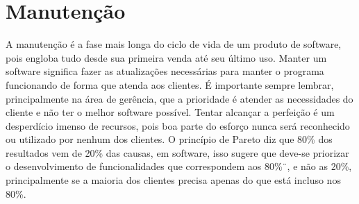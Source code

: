\documentclass{article}
\begin{document}
\section{Manutenção}
A manutenção é a fase mais longa do ciclo de vida de um produto de software, pois engloba tudo desde sua primeira venda até seu último uso. Manter um software significa fazer as atualizações necessárias para manter o programa funcionando de forma que atenda aos clientes. É importante sempre lembrar, principalmente na área de gerência, que a prioridade é atender as necessidades do cliente e não ter o melhor software possível. Tentar alcançar a perfeição é um desperdício imenso de recursos, pois boa parte do esforço nunca será reconhecido ou utilizado por nenhum dos clientes. O princípio de Pareto diz que 80\% dos resultados vem de 20\% das causas, em software, isso sugere que deve-se priorizar o desenvolvimento de funcionalidades que correspondem aos 80\%¨, e não as 20\%, principalmente se a maioria dos clientes precisa apenas do que está incluso nos 80\%.

\nocite{*}


\end{document}
